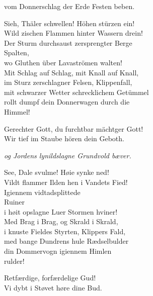 \documentclass[parskip=full]{scrreprt}
\begin{document}
\begin{multicols}{2}
vom Donnerschlag der Erde Festen beben.

Sieh, Thäler schwellen! Höhen stürzen ein!\\
Wild zischen Flammen hinter Wassern drein!\\
Der Sturm durchsaust zersprengter Berge\\
\hspace*{1em}Spalten,\\
wo Gluthen über Lavaströmen walten!\\
Mit Schlag auf Schlag, mit Knall auf Knall,\\
im Sturz zerschlagner Felsen, Klippenfall,\\
mit schwarzer Wetter schrecklichem Getümmel\\
rollt dumpf dein Donnerwagen durch die\\
\hspace*{1em}Himmel!

Gerechter Gott, du furchtbar mächtger Gott!\\
Wir tief im Staube hören dein Geboth.

\columnbreak\itshape
og Jordens lynildslagne Grundvold bæver.

See, Dale svulme! Høie synke ned!\\
Vildt flammer Ilden hen i Vandets Fied!\\
Igiennem vidtadsplittede\\
\hspace*{1em}Ruiner\\
i høit opslagne Luer Stormen hviner!\\
Med Brag i Brag, og Skrald i Skrald,\\
i knuste Fieldes Styrten, Klippers Fald,\\
med bange Dundrens hule Rædselbulder\\
din Dommervogn igiennem Himlen\\
\hspace*{1em}rulder!

Retfærdige, forfærdelige Gud!\\
Vi dybt i Støvet høre dine Bud.
\end{multicols}
\end{document}
